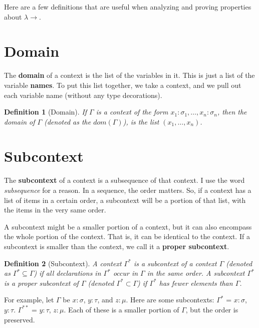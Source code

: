 \documentclass{book}
\numberwithin{equation}{chapter}
\newcommand{\vocab}{\textbf}
\newtheorem{definition}{Definition}
\begin{document}
Here are a few definitions that are useful when analyzing and proving properties about $\lambda\rightarrow$.


\section{Domain}

The \vocab{domain} of a context is the list of the variables in it. This is just a list of the variable \vocab{names}. To put this list together, we take a context, and we pull out each variable name (without any type decorations).

\begin{definition}[Domain]
If $\Gamma$ is a context of the form $x_{1} : \sigma_{1}, \ldots, x_{n} : \sigma_{n}$, then the domain of $\Gamma$ (denoted as the $dom(\Gamma)$), is the list $(x_{1}, \ldots, x_{n})$.
\end{definition}


\section{Subcontext}

The \vocab{subcontext} of a context is a subsequence of that context. I use the word \textit{subsequence} for a reason. In a sequence, the order matters. So, if a context has a list of items in a certain order, a subcontext will be a portion of that list, with the items in the very same order.

A subcontext might be a smaller portion of a context, but it can also encompass the whole portion of the context. That is, it can be identical to the context. If a subcontext is smaller than the context, we call it a \vocab{proper subcontext}.

\begin{definition}[Subcontext]
A context $\Gamma^{*}$ is a subcontext of a context $\Gamma$ (denoted as $\Gamma^{*} \subseteq \Gamma$) if all declarations in $\Gamma^{*}$ occur in $\Gamma$ in the same order. A subcontext $\Gamma^{*}$ is a proper subcontext of $\Gamma$ (denoted $\Gamma^{*} \subset \Gamma$) if $\Gamma^{*}$ has fewer elements than $\Gamma$.
\end{definition}

\noindent
For example, let $\Gamma$ be $x: \sigma$, $y : \tau$, and $z : \mu$. Here are some subcontexts: $\Gamma^{*}$ = $x: \sigma$, $y : \tau$. $\Gamma^{**}$ = $y : \tau$, $z : \mu$. Each of these is a smaller portion of $\Gamma$, but the order is preserved. 
\end{document}

